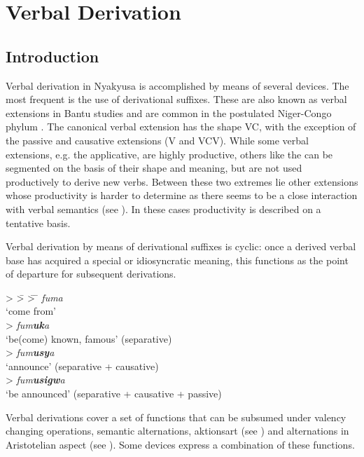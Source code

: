 \chapter{Verbal Derivation}\label{VerbalDerivation}
\section{Introduction}
Verbal derivation in Nyakyusa is accomplished by means of several devices. The most frequent is the use of derivational suffixes. These are also known as verbal extensions in Bantu studies \citep{SchadebergT2003a} and are common in the postulated Niger-Congo phylum \citep{HymanL2007}. The canonical verbal extension has the shape VC, with the exception of the passive and causative extensions (V and VCV). While some verbal extensions, e.g. the applicative, are highly productive, others like the  can be segmented on the basis of their shape and meaning, but are not used productively to derive new verbs. Between these two extremes lie other extensions whose productivity is harder to determine as there seems to be a close interaction with verbal semantics (see \citealt{FleischA2000}). In these cases productivity is described on a tentative basis.

Verbal derivation by means of derivational suffixes is cyclic: once a derived verbal base has acquired a special or idiosyncratic meaning, this functions as the point of departure for subsequent derivations. 
\begin{exe}
\ex
\begin{tabbing}
 > \= > \= > \=\kill
\textit{fuma}\\
\lq come from'\\
 > \textit{fum\textbf{uk}a} \\
\>\lq be(come) known, famous' (separative)\\
\> > \textit{fum\textbf{usy}a}\\
\> \>\lq announce' (separative + causative)\\
\>\> > \textit{fum\textbf{usigw}a}\\
\>\>\> \lq be announced' (separative + causative + passive)
\end{tabbing}
\end{exe}

Verbal derivations cover a set of functions that can be subsumed under valency changing operations, semantic alternations, aktionsart (see ) and alternations in Aristotelian aspect (see ). Some devices express a combination of these functions.

